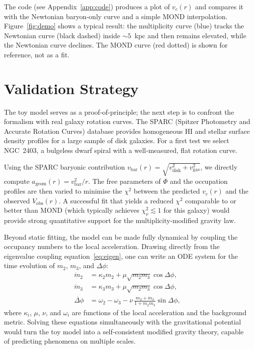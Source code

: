 \documentclass[11pt,a4paper]{article}
\theoremstyle{definition}
\theoremstyle{remark}
\begin{document}
The code (see Appendix~\ref{app:code}) produces a plot of $v_c(r)$ and compares it with the Newtonian baryon‑only curve and a simple MOND interpolation.
Figure~\ref{fig:demo} shows a typical result: the multiplicity curve (blue) tracks the Newtonian curve (black dashed) inside $\sim5$~kpc and then remains elevated, while the Newtonian curve declines.
The MOND curve (red dotted) is shown for reference, not as a fit.

\section{Validation Strategy}
The toy model serves as a proof‑of‑principle; the next step is to confront the formalism with real galaxy rotation curves.
The SPARC (Spitzer Photometry and Accurate Rotation Curves) database provides homogeneous HI and stellar surface density profiles for a large sample of disk galaxies.
For a first test we select NGC~2403, a bulgeless dwarf spiral with a well‑measured, flat rotation curve.

Using the SPARC baryonic contribution $v_{\text{bar}}(r)=\sqrt{v_{\text{disk}}^2+v_{\text{gas}}^2}$, we directly compute $a_{\text{geom}}(r)=v_{\text{bar}}^2/r$.
The free parameters of $\Phi$ and the occupation profiles are then varied to minimise the $\chi^2$ between the predicted $v_c(r)$ and the observed $V_{\text{obs}}(r)$.
A successful fit that yields a reduced $\chi^2$ comparable to or better than MOND (which typically achieves $\chi^2_\nu\lesssim1$ for this galaxy) would provide strong quantitative support for the multiplicity‑modified gravity law.

Beyond static fitting, the model can be made fully dynamical by coupling the occupancy numbers to the local acceleration.
Drawing directly from the eigenvalue coupling equation~\eqref{eq:eigen}, one can write an ODE system for the time evolution of $m_2$, $m_3$, and $\Delta\phi$:
\begin{align}
\dot m_2 &= \kappa_2 m_2 + \mu\sqrt{m_2 m_3}\cos\Delta\phi,\nonumber\\
\dot m_3 &= \kappa_3 m_3 + \mu\sqrt{m_2 m_3}\cos\Delta\phi,\nonumber\\
\dot{\Delta\phi} &= \omega_2-\omega_3 - \nu\,\frac{m_2+m_3}{1+m_2m_3}\sin\Delta\phi,
\label{eq:odes}
\end{align}
where $\kappa_i$, $\mu$, $\nu$, and $\omega_i$ are functions of the local acceleration and the background metric.
Solving these equations simultaneously with the gravitational potential would turn the toy model into a self‑consistent modified gravity theory, capable of predicting phenomena on multiple scales.
\end{document}
